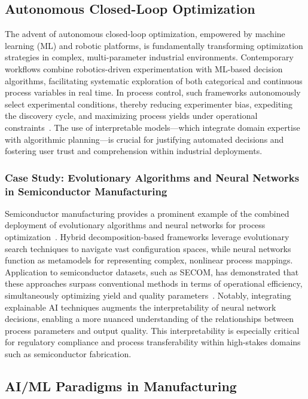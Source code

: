 \documentclass[sigconf]{acmart}
\begin{document}
\subsection{Autonomous Closed-Loop Optimization}

The advent of autonomous closed-loop optimization, empowered by machine learning (ML) and robotic platforms, is fundamentally transforming optimization strategies in complex, multi-parameter industrial environments. Contemporary workflows combine robotics-driven experimentation with ML-based decision algorithms, facilitating systematic exploration of both categorical and continuous process variables in real time. In process control, such frameworks autonomously select experimental conditions, thereby reducing experimenter bias, expediting the discovery cycle, and maximizing process yields under operational constraints~\cite{ref79}. The use of interpretable models—which integrate domain expertise with algorithmic planning—is crucial for justifying automated decisions and fostering user trust and comprehension within industrial deployments.

\subsubsection{Case Study: Evolutionary Algorithms and Neural Networks in Semiconductor Manufacturing}

Semiconductor manufacturing provides a prominent example of the combined deployment of evolutionary algorithms and neural networks for process optimization~\cite{ref22}. Hybrid decomposition-based frameworks leverage evolutionary search techniques to navigate vast configuration spaces, while neural networks function as metamodels for representing complex, nonlinear process mappings. Application to semiconductor datasets, such as SECOM, has demonstrated that these approaches surpass conventional methods in terms of operational efficiency, simultaneously optimizing yield and quality parameters~\cite{ref22}. Notably, integrating explainable AI techniques augments the interpretability of neural network decisions, enabling a more nuanced understanding of the relationships between process parameters and output quality. This interpretability is especially critical for regulatory compliance and process transferability within high-stakes domains such as semiconductor fabrication.

\subsection{AI/ML Paradigms in Manufacturing}
\end{document}
